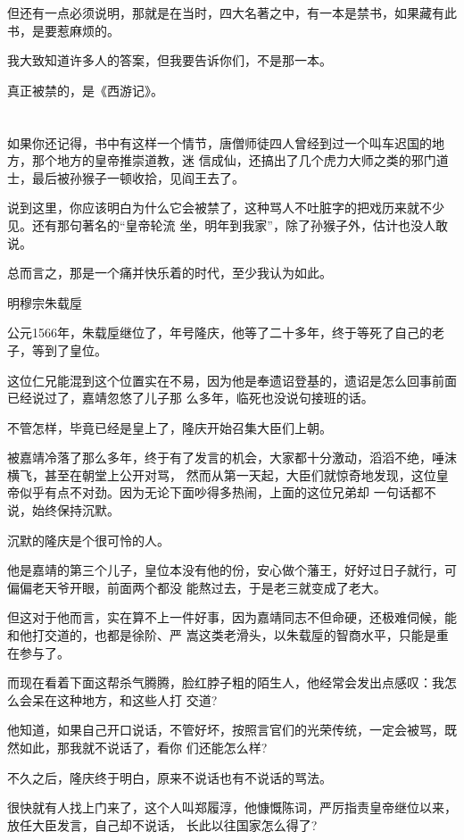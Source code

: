 \documentclass[11pt,a4paper,onecolumn]{article}
\begin{document}
但还有一点必须说明，那就是在当时，四大名著之中，有一本是禁书，如果藏有此书，是要惹麻烦的。

我大致知道许多人的答案，但我要告诉你们，不是那一本。

真正被禁的，是《西游记》。

\section[\thesection]{}

如果你还记得，书中有这样一个情节，唐僧师徒四人曾经到过一个叫车迟国的地方，那个地方的皇帝推崇道教，迷
信成仙，还搞出了几个虎力大师之类的邪门道士，最后被孙猴子一顿收拾，见阎王去了。

说到这里，你应该明白为什么它会被禁了，这种骂人不吐脏字的把戏历来就不少见。还有那句著名的``皇帝轮流
坐，明年到我家''，除了孙猴子外，估计也没人敢说。

总而言之，那是一个痛并快乐着的时代，至少我认为如此。

明穆宗朱载垕

公元1566年，朱载垕继位了，年号隆庆，他等了二十多年，终于等死了自己的老子，等到了皇位。

这位仁兄能混到这个位置实在不易，因为他是奉遗诏登基的，遗诏是怎么回事前面已经说过了，嘉靖忽悠了儿子那
么多年，临死也没说句接班的话。

不管怎样，毕竟已经是皇上了，隆庆开始召集大臣们上朝。

被嘉靖冷落了那么多年，终于有了发言的机会，大家都十分激动，滔滔不绝，唾沫横飞，甚至在朝堂上公开对骂，
然而从第一天起，大臣们就惊奇地发现，这位皇帝似乎有点不对劲。因为无论下面吵得多热闹，上面的这位兄弟却
一句话都不说，始终保持沉默。

沉默的隆庆是个很可怜的人。

他是嘉靖的第三个儿子，皇位本没有他的份，安心做个藩王，好好过日子就行，可偏偏老天爷开眼，前面两个都没
能熬过去，于是老三就变成了老大。

但这对于他而言，实在算不上一件好事，因为嘉靖同志不但命硬，还极难伺候，能和他打交道的，也都是徐阶、严
嵩这类老滑头，以朱载垕的智商水平，只能是重在参与了。

而现在看着下面这帮杀气腾腾，脸红脖子粗的陌生人，他经常会发出点感叹：我怎么会呆在这种地方，和这些人打
交道?

他知道，如果自己开口说话，不管好坏，按照言官们的光荣传统，一定会被骂，既然如此，那我就不说话了，看你
们还能怎么样?

不久之后，隆庆终于明白，原来不说话也有不说话的骂法。

很快就有人找上门来了，这个人叫郑履淳，他慷慨陈词，严厉指责皇帝继位以来，放任大臣发言，自己却不说话，
长此以往国家怎么得了?
\end{document}
